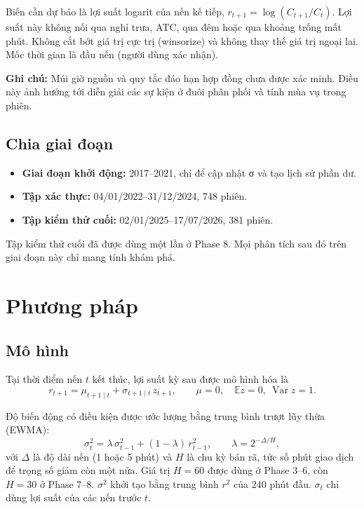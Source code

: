 \documentclass[11pt,a4paper]{article}
\newcommand{\ghichu}[1]{\par\noindent\colorbox{blue!8}{\parbox{\dimexpr\linewidth-2\fboxsep}{\small\textbf{Ghi chú:} #1}}\par}
\begin{document}
Biến cần dự báo là lợi suất logarit của nến kế tiếp, $r_{t+1}=\log(C_{t+1}/C_t)$. Lợi suất này không nối qua nghỉ trưa, ATC, qua đêm hoặc qua khoảng trống mất phút. Không cắt bớt giá trị cực trị (winsorize) và không thay thế giá trị ngoại lai. Mốc thời gian là đầu nến (người dùng xác nhận).

\ghichu{Múi giờ nguồn và quy tắc đáo hạn hợp đồng chưa được xác minh. Điều này ảnh hưởng tới diễn giải các sự kiện ở đuôi phân phối và tính mùa vụ trong phiên.}

\subsection{Chia giai đoạn}

\begin{itemize}[nosep]
\item \textbf{Giai đoạn khởi động:} 2017--2021, chỉ để cập nhật σ và tạo lịch sử phần dư.
\item \textbf{Tập xác thực:} 04/01/2022--31/12/2024, 748 phiên.
\item \textbf{Tập kiểm thử cuối:} 02/01/2025--17/07/2026, 381 phiên.
\end{itemize}

Tập kiểm thử cuối đã được dùng một lần ở Phase 8. Mọi phân tích sau đó trên giai đoạn này chỉ mang tính khám phá.

\section{Phương pháp}

\subsection{Mô hình}

Tại thời điểm nến $t$ kết thúc, lợi suất kỳ sau được mô hình hóa là
\begin{equation}
r_{t+1} = \mu_{t+1\mid t} + \sigma_{t+1\mid t}\, z_{t+1}, \qquad \mu = 0,\quad \mathbb{E}z=0,\ \operatorname{Var}z = 1 .
\end{equation}

Độ biến động có điều kiện được ước lượng bằng trung bình trượt lũy thừa (EWMA):
\begin{equation}
\sigma^2_t = \lambda\,\sigma^2_{t-1} + (1-\lambda)\, r^2_{t-1}, \qquad \lambda = 2^{-\Delta/H},
\end{equation}
với $\Delta$ là độ dài nến (1 hoặc 5 phút) và $H$ là chu kỳ bán rã, tức số phút giao dịch để trọng số giảm còn một nửa. Giá trị $H=60$ được dùng ở Phase 3--6, còn $H=30$ ở Phase 7--8. $\sigma^2$ khởi tạo bằng trung bình $r^2$ của 240 phút đầu. $\sigma_t$ chỉ dùng lợi suất của các nến trước $t$.
\end{document}
